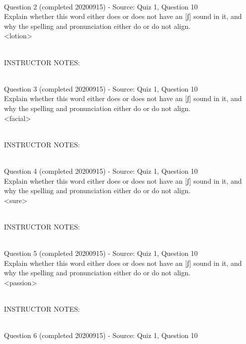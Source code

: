 \documentclass[12pt]{article}
\begin{document}
~\\

{\large Question 2} (completed 20200915) - Source: Quiz 1, Question 10\\

Explain whether this word either does or does not have an [ʃ] sound in it, and why the spelling and pronunciation either do or do not align.\\

<lotion>


~\\
INSTRUCTOR NOTES: 


~\\

{\large Question 3} (completed 20200915) - Source: Quiz 1, Question 10\\

Explain whether this word either does or does not have an [ʃ] sound in it, and why the spelling and pronunciation either do or do not align.\\

<facial>


~\\
INSTRUCTOR NOTES: 


~\\

{\large Question 4} (completed 20200915) - Source: Quiz 1, Question 10\\

Explain whether this word either does or does not have an [ʃ] sound in it, and why the spelling and pronunciation either do or do not align.\\

<sure>


~\\
INSTRUCTOR NOTES: 


~\\

{\large Question 5} (completed 20200915) - Source: Quiz 1, Question 10\\

Explain whether this word either does or does not have an [ʃ] sound in it, and why the spelling and pronunciation either do or do not align.\\

<passion>


~\\
INSTRUCTOR NOTES: 


~\\

{\large Question 6} (completed 20200915) - Source: Quiz 1, Question 10\\
\end{document}
